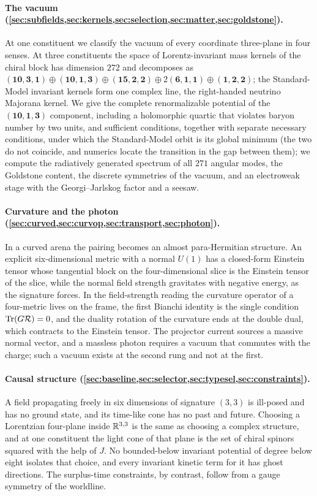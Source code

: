 \paragraph{The vacuum (\cref{sec:subfields,sec:kernels,sec:selection,sec:matter,sec:goldstone}).} At one constituent we
classify the vacuum of every coordinate three-plane in four senses. At three constituents the space of Lorentz-invariant
mass kernels of the chiral block has dimension $272$ and decomposes as
$(\mathbf{10},\mathbf3,\mathbf1)\oplus(\mathbf{10},\mathbf1,\mathbf3)\oplus(\mathbf{15},\mathbf2,\mathbf2)\oplus
2(\mathbf6,\mathbf1,\mathbf1)\oplus(\mathbf1,\mathbf2,\mathbf2)$; the Standard-Model invariant kernels form one complex
line, the right-handed neutrino Majorana kernel. We give the complete renormalizable potential of the
$(\mathbf{10},\mathbf1,\mathbf3)$ component, including a holomorphic quartic that violates baryon number by two units,
and sufficient conditions, together with separate necessary conditions, under which the Standard-Model orbit is its global minimum (the two
do not coincide, and numerics locate the transition in the gap between them); we compute the
radiatively generated spectrum of all $271$ angular modes, the Goldstone content, the discrete symmetries of the vacuum,
and an electroweak stage with the Georgi--Jarlskog factor and a seesaw.

\paragraph{Curvature and the photon (\cref{sec:curved,sec:curvop,sec:transport,sec:photon}).} In a curved arena the
pairing becomes an almost para-Hermitian structure. An explicit six-dimensional metric with a normal $U(1)$ has a
closed-form Einstein tensor whose tangential block on the four-dimensional slice is the Einstein tensor of the slice, while
the normal field strength gravitates with negative energy, as the signature forces. In the field-strength reading the
curvature operator of a four-metric lives on the frame, the first Bianchi identity is the single condition
$\operatorname{Tr}(G\mathcal R)=0$, and the duality rotation of the curvature ends at the double dual, which contracts to the Einstein tensor.
The projector current sources a massive normal vector, and a massless photon requires a vacuum that commutes with the
charge; such a vacuum exists at the second rung and not at the first.

\paragraph{Causal structure (\cref{sec:baseline,sec:selector,sec:typesel,sec:constraints}).} A field propagating freely
in six dimensions of signature $(3,3)$ is ill-posed and has no ground state, and its time-like cone has no past and future.
Choosing a Lorentzian four-plane inside $\mathbb{R}^{3,3}$ is the same as choosing a complex structure, and at one constituent the
light cone of that plane is the set of chiral spinors squared with the help of $J$. No bounded-below invariant potential
of degree below eight isolates that choice, and every invariant kinetic term for it has ghost directions. The surplus-time
constraints, by contrast, follow from a gauge symmetry of the worldline.

